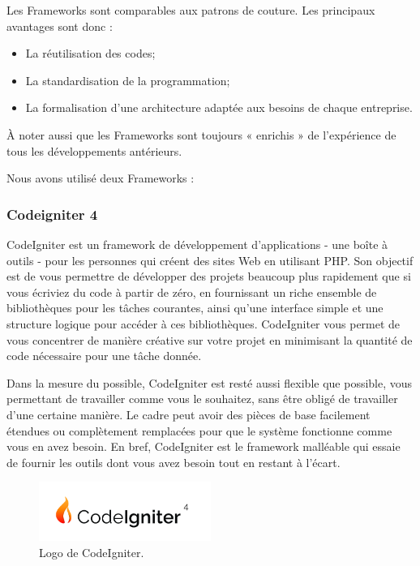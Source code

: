 \documentclass[french]{report}
\begin{document}
    Les Frameworks sont comparables aux patrons de couture. Les principaux avantages sont donc :
    \begin{itemize}
        \item La réutilisation des codes;
        \item La standardisation de la programmation;
        \item La formalisation d'une architecture adaptée aux besoins de chaque entreprise.
    \end{itemize}
   
    À noter aussi que les Frameworks sont toujours « enrichis » de l'expérience de tous les développements antérieurs.
    
    Nous avons utilisé deux Frameworks :

        \subsubsection{Codeigniter 4}
        CodeIgniter est un framework de développement d'applications - une boîte à outils -
	pour les personnes qui créent des sites Web en utilisant PHP. Son objectif est de vous
	permettre de développer des projets beaucoup plus rapidement que si vous écriviez du 
	code à partir de zéro, en fournissant un riche ensemble de bibliothèques pour les 
	tâches courantes, ainsi qu'une interface simple et une structure logique pour accéder
	à ces bibliothèques. CodeIgniter vous permet de vous concentrer de manière créative sur 
	votre projet en minimisant la quantité de code nécessaire pour une tâche donnée.

        Dans la mesure du possible, CodeIgniter est resté aussi flexible que possible, 
	vous permettant de travailler comme vous le souhaitez, sans être obligé de 
	travailler d'une certaine manière. Le cadre peut avoir des pièces de base 
	facilement étendues ou complètement remplacées pour que le système fonctionne 
	comme vous en avez besoin. En bref, CodeIgniter est le framework malléable 
	qui essaie de fournir les outils dont vous avez besoin tout en restant à l'écart.
        
        \begin{figure}[H]
            \centering
            \includegraphics[width=0.5\textwidth]{images/ci-new-logo-04-02.jpg}
            \caption{Logo de CodeIgniter.}
            \label{fig:my_label}
        \end{figure}
        
\end{document}
